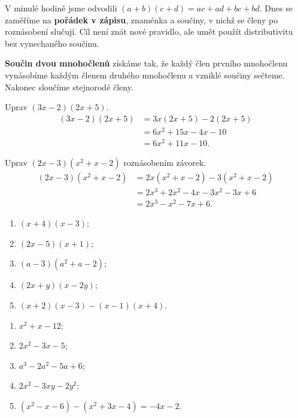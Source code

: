 \documentclass[11pt,a4paper]{article}
\begin{document}
V minulé hodině jsme odvodili $(a+b)(c+d)=ac+ad+bc+bd$. Dnes se zaměříme na \textbf{pořádek v zápisu}, znaménka a součiny, v nichž se členy po roznásobení slučují. Cíl není znát nové pravidlo, ale umět použít distributivitu bez vynechaného součinu.
\begin{definiceBox}[title={Věta - Součin mnohočlenů}]
\textbf{Součin dvou mnohočlenů} získáme tak, že každý člen prvního mnohočlenu vynásobíme každým členem druhého mnohočlenu a vzniklé součiny sečteme. Nakonec sloučíme stejnorodé členy.
\end{definiceBox}
\begin{prikladReseniBox}[title={Příklad 1}]
Uprav $(3x-2)(2x+5)$.
\tcblower
\begin{align*}
(3x-2)(2x+5)&=3x(2x+5)-2(2x+5)\\
&=6x^2+15x-4x-10\\
&=6x^2+11x-10.
\end{align*}
\end{prikladReseniBox}
\begin{prikladReseniBox}[title={Příklad 2}]
Uprav $(2x-3)(x^2+x-2)$ roznásobením závorek.
\tcblower
\begin{align*}
(2x-3)(x^2+x-2)
&=2x(x^2+x-2)-3(x^2+x-2)\\
&=2x^3+2x^2-4x-3x^2-3x+6\\
&=2x^3-x^2-7x+6.
\end{align*}
\end{prikladReseniBox}
\begin{zadaniReseniBox}[title={Samostatná práce 1}]
\begin{enumerate}[label=\alph*)]
\item $(x+4)(x-3)$;
\item $(2x-5)(x+1)$;
\item $(a-3)(a^2+a-2)$;
\item $(2x+y)(x-2y)$;
\item $(x+2)(x-3)-(x-1)(x+4)$.
\end{enumerate}
\tcblower
\begin{enumerate}[label=\alph*)]
\item $x^2+x-12$;
\item $2x^2-3x-5$;
\item $a^3-2a^2-5a+6$;
\item $2x^2-3xy-2y^2$;
\item $(x^2-x-6)-(x^2+3x-4)=-4x-2$.
\end{enumerate}
\end{zadaniReseniBox}
\end{document}
